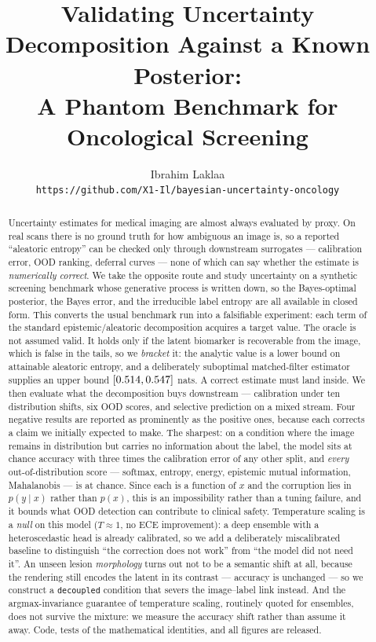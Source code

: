\documentclass{article}
\title{Validating Uncertainty Decomposition Against a Known Posterior:\\
A Phantom Benchmark for Oncological Screening}
\author{%
  Ibrahim Laklaa \\
  \texttt{https://github.com/X1-Il/bayesian-uncertainty-oncology}
}
\begin{document}
\maketitle

\begin{abstract}
Uncertainty estimates for medical imaging are almost always evaluated by proxy.
On real scans there is no ground truth for how ambiguous an image is, so a
reported ``aleatoric entropy'' can be checked only through downstream surrogates
--- calibration error, OOD ranking, deferral curves --- none of which can say
whether the estimate is \emph{numerically correct}. We take the opposite route
and study uncertainty on a synthetic screening benchmark whose generative process
is written down, so the Bayes-optimal posterior, the Bayes error, and the
irreducible label entropy are all available in closed form. This converts the
usual benchmark run into a falsifiable experiment: each term of the standard
epistemic/aleatoric decomposition acquires a target value.
%
The oracle is not assumed valid. It holds only if the latent biomarker is
recoverable from the image, which is false in the tails, so we \emph{bracket} it:
the analytic value is a lower bound on attainable aleatoric entropy, and a
deliberately suboptimal matched-filter estimator supplies an upper bound
$[0.514, 0.547]$ nats. A correct estimate must land inside.
%
We then evaluate what the decomposition buys downstream --- calibration under ten
distribution shifts, six OOD scores, and selective prediction on a mixed stream.
Four negative results are reported as prominently as the positive ones, because
each corrects a claim we initially expected to make. The sharpest: on a condition
where the image remains in distribution but carries no information about the
label, the model sits at chance accuracy with three times the calibration error
of any other split, and \emph{every} out-of-distribution score --- softmax,
entropy, energy, epistemic mutual information, Mahalanobis --- is at chance.
Since each is a function of $x$ and the corruption lies in $p(y \mid x)$ rather
than $p(x)$, this is an impossibility rather than a tuning failure, and it bounds
what OOD detection can contribute to clinical safety. Temperature scaling is a
\emph{null} on this model ($T \approx 1$, no ECE improvement): a deep ensemble
with a heteroscedastic head is already calibrated, so we add a deliberately
miscalibrated baseline to distinguish ``the correction does not work'' from ``the
model did not need it''. An unseen lesion \emph{morphology} turns out not to be a
semantic shift at all, because the rendering still encodes the latent in its
contrast --- accuracy is unchanged --- so we construct a \texttt{decoupled}
condition that severs the image--label link instead. And the argmax-invariance
guarantee of temperature scaling, routinely quoted for ensembles, does not
survive the mixture: we measure the accuracy shift rather than assume it away.
Code, tests of the mathematical identities, and all figures are released.
\end{abstract}
\end{document}

